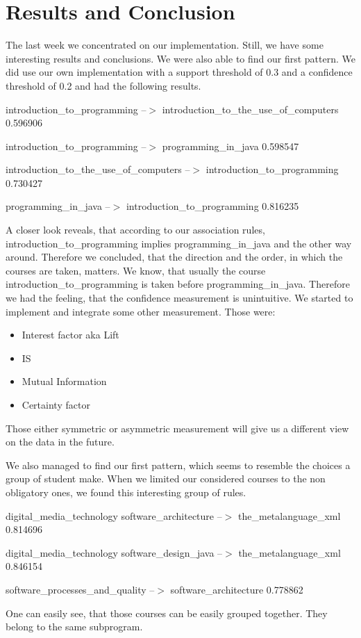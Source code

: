 \section{Results and Conclusion}

The last week we concentrated on our implementation.
Still, we have some interesting results and conclusions. We were also able to find our first pattern.
\newline
We did use our own implementation with a support threshold of 0.3 and a confidence threshold of 0.2 and had the following results.
\newline


introduction\_to\_programming --$>$ introduction\_to\_the\_use\_of\_computers 0.596906

introduction\_to\_programming --$>$ programming\_in\_java 0.598547

introduction\_to\_the\_use\_of\_computers --$>$ introduction\_to\_programming 0.730427

programming\_in\_java --$>$ introduction\_to\_programming 0.816235
\newline

A closer look reveals, that according to our association rules, introduction\_to\_programming implies
programming\_in\_java and the other way around.
Therefore we concluded, that the direction and the order, in which the courses are taken, matters.
We know, that usually the course introduction\_to\_programming is taken before programming\_in\_java.
Therefore we had the feeling, that the confidence measurement is unintuitive.
We started to implement and integrate some other measurement.
Those were:
\begin{itemize}
 \item Interest factor aka Lift
\item IS
\item Mutual Information
\item Certainty factor
\end{itemize}

Those either symmetric or asymmetric measurement will give us a different view on the data in the future.
\newline

We also managed to find our first pattern, which seems to resemble the choices a group of student make.
When we limited our considered courses to the non obligatory ones, we found this interesting group of rules.
\newline


digital\_media\_technology software\_architecture --$>$ the\_metalanguage\_xml 0.814696

digital\_media\_technology software\_design\_java --$>$ the\_metalanguage\_xml 0.846154

software\_processes\_and\_quality --$>$ software\_architecture 0.778862
\newline

One can easily see, that those courses can be easily grouped together. They belong to the same subprogram.
